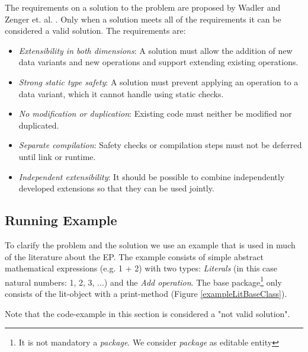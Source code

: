 \documentclass{report}
\begin{document}
The requirements on a solution to the problem are proposed by Wadler and Zenger et. al. \cite{Wadler-Expression-1998, Odersky-Expression-2005, Oliv-Extensibility-2012}. Only when a solution meets all of the requirements it can be considered a valid solution. The requirements are:

\begin{itemize}
  \item \emph{Extensibility in both dimensions}: A solution must allow the addition of new data variants and new operations and support extending existing operations.
  \item \emph{Strong static type safety}: A solution must prevent applying an operation to a data variant, which it cannot handle using static checks.
  \item \emph{No modification or duplication}: Existing code must neither be modified nor duplicated.
  \item \emph{Separate compilation}: Safety checks or compilation steps must not be deferred until link or runtime.
  \item \emph{Independent extensibility}: It should be possible to combine independently developed extensions so that they can be used jointly.
\end{itemize}


\subsection{Running Example}
\label{example}

To clarify the problem and the solution we use an example that is used in much of the literature about the EP. The example consists of simple abstract mathematical expressions (e.g. 1 + 2) with two types: \emph{Literals} (in this case natural numbers: 1, 2, 3, ...) and the \emph{Add operation}. The base package\footnote{It is not mandatory a \emph{package}. We consider \emph{package} as editable entity} only consists of the lit-object with a print-method (Figure \ref{exampleLitBaseClass}).

Note that the code-example in this section is considered a "not valid solution".
\end{document}
